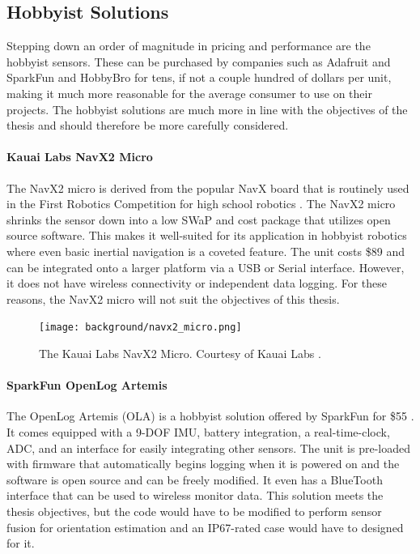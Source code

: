 \subsection{Hobbyist Solutions}
Stepping down an order of magnitude in pricing and performance are the hobbyist sensors.
These can be purchased by companies such as Adafruit and SparkFun and HobbyBro for tens, if not a couple hundred of dollars per unit, making it much more reasonable for the average consumer to use on their projects.
The hobbyist solutions are much more in line with the objectives of the thesis and should therefore be more carefully considered.

\paragraph*{Kauai Labs NavX2 Micro} The NavX2 micro is derived from the popular NavX board that is routinely used in the First Robotics Competition for high school robotics \cite{KauaiLabs}.
The NavX2 micro shrinks the sensor down into a low SWaP and cost package that utilizes open source software.
This makes it well-suited for its application in hobbyist robotics where even basic inertial navigation is a coveted feature.
The unit costs \$89 and can be integrated onto a larger platform via a USB or Serial interface.
However, it does not have wireless connectivity or independent data logging.
For these reasons, the NavX2 micro will not suit the objectives of this thesis.

\begin{figure}
    \centering
    \caption[Kauai Labs NavX2 Micro]{The Kauai Labs NavX2 Micro.
    Courtesy of Kauai Labs \cite{KauaiLabs}.}
    \texttt{[image: background/navx2\_micro.png]}
\end{figure}

\paragraph*{SparkFun OpenLog Artemis} The OpenLog Artemis (OLA) is a hobbyist solution offered by SparkFun for \$55 \cite{SparkFun}.
It comes equipped with a 9-DOF IMU, battery integration, a real-time-clock, ADC, and an interface for easily integrating other sensors.
The unit is pre-loaded with firmware that automatically begins logging when it is powered on and the software is open source and can be freely modified.
It even has a BlueTooth interface that can be used to wireless monitor data.
This solution meets the thesis objectives, but the code would have to be modified to perform sensor fusion for orientation estimation and an IP67-rated case would have to designed for it.

